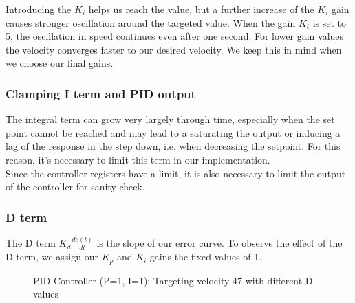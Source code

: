 \noindent
Introducing the $K_i$ helps us reach the value, but a further increase of the $K_i$ gain causes stronger oscillation around the targeted value. When the gain $K_i$ is set to 5, the oscillation in speed continues even after one second. For lower gain values the velocity converges faster to our desired velocity. We keep this in mind when we choose our final gains.

\subsubsection*{Clamping I term and PID output}

The integral term can grow very largely through time, especially when the set point cannot be reached and may lead to a saturating the output or inducing a lag of the response in the step down, i.e. when decreasing the setpoint. For this reason, it’s necessary to limit this term in our implementation.\\
Since the controller registers have a limit, it is also necessary to limit the output of the controller for sanity check. 

\subsubsection*{D term}
The D term
$K_d \frac{de(t)}{dt}$
is the slope of our error curve. To observe the effect of the D term, we assign our $K_p$ and $K_i$ gains the fixed values of 1.

\begin{figure}[H]
    \centering
{}
    \caption{PID-Controller (P=1, I=1): Targeting velocity 47 with different D values} \label{fig:D_demo}
\end{figure}

